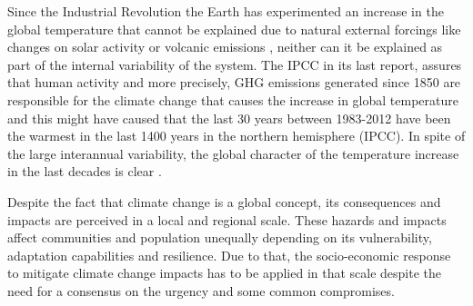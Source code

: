 Since the Industrial Revolution the Earth has experimented an increase in the global temperature that cannot be explained due to natural external forcings like changes on solar activity or volcanic emissions \cite*{Bindoff2013}, neither can it be explained as part of the internal variability of the system. The IPCC in its last report, assures that human activity and more precisely, GHG emissions generated since 1850 are responsible for the climate change that causes the increase in global temperature and this might have caused that the last 30 years between 1983-2012 have been the warmest in the last 1400 years in the northern hemisphere (IPCC). In spite of the large interannual variability, the global character of the temperature increase in the last decades is clear \cite*{Stocker2013}.




Despite the fact that climate change is a global concept, its consequences and impacts are perceived in a local and regional scale. These hazards and impacts affect communities and population unequally depending on its vulnerability, adaptation capabilities and resilience. Due to that, the socio-economic response to mitigate climate change impacts has to be applied in that scale despite the need for a consensus on the urgency and some common compromises.


